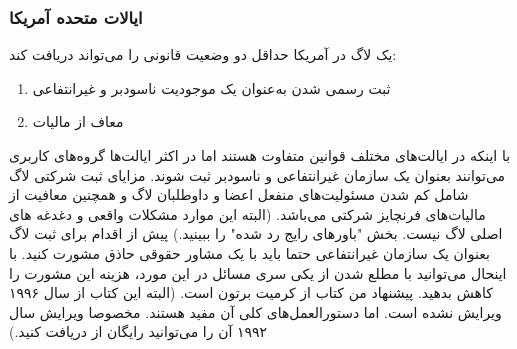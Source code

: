 \subsubsection{ایالات متحده آمریکا}
یک لاگ در آمریکا حداقل دو وضعیت قانونی را می‌تواند دریافت کند:

\begin{enumerate}
\item
ثبت رسمی شدن به‌عنوان یک موجودیت ناسودبر و غیرانتفاعی
\item
معاف از مالیات
\end{enumerate}

با اینکه در ایالت‌های مختلف قوانین متفاوت هستند اما در اکثر ایالت‌ها
گروه‌های کاربری می‌توانند بعنوان یک سازمان غیرانتفاعی و ناسودبر ثبت شوند.
مزایای ثبت شرکتی لاگ شامل کم شدن مسئولیت‌های منفعل اعضا و داوطلبان لاگ
و همچنین معافیت از مالیات‌های فرنچایز شرکتی می‌باشد.
(البته این موارد مشکلات واقعی و دغدغه های اصلی لاگ نیست.
بخش "باورهای رایج رد شده" را ببینید.)
پیش از اقدام برای ثبت لاگ بعنوان یک سازمان غیرانتفاعی حتما
باید با یک مشاور حقوقی حاذق مشورت کنید. با اینحال می‌توانید با مطلع شدن
از یکی سری مسائل در این مورد، هزینه این مشورت را کاهش بدهید.
پیشنهاد من کتاب
از کرمیت برتون است. (البته این کتاب از سال ۱۹۹۶ ویرایش نشده است.
اما دستورالعمل‌های کلی آن مفید هستند. مخصوصا ویرایش سال ۱۹۹۲ آن
را می‌توانید رایگان از
دریافت کنید.)

